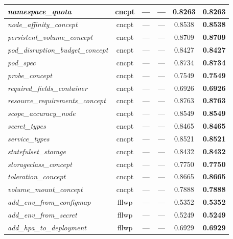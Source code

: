 \begin{footnotesize}
\begin{longtable}{|p{3.6cm}|c|c|c|c|c|}
\hline
\textit{namespace\_\allowbreak{}quota} & cncpt & --- & --- & 0.8263 & \textbf{0.8263} \\
\hline
\textit{node\_\allowbreak{}affinity\_\allowbreak{}concept} & cncpt & --- & --- & 0.8538 & \textbf{0.8538} \\
\hline
\textit{persistent\_\allowbreak{}volume\_\allowbreak{}concept} & cncpt & --- & --- & 0.8709 & \textbf{0.8709} \\
\hline
\textit{pod\_\allowbreak{}disruption\_\allowbreak{}budget\_\allowbreak{}concept} & cncpt & --- & --- & 0.8427 & \textbf{0.8427} \\
\hline
\textit{pod\_\allowbreak{}spec} & cncpt & --- & --- & 0.8734 & \textbf{0.8734} \\
\hline
\textit{probe\_\allowbreak{}concept} & cncpt & --- & --- & 0.7549 & \textbf{0.7549} \\
\hline
\textit{required\_\allowbreak{}fields\_\allowbreak{}container} & cncpt & --- & --- & 0.6926 & \textbf{0.6926} \\
\hline
\textit{resource\_\allowbreak{}requirements\_\allowbreak{}concept} & cncpt & --- & --- & 0.8763 & \textbf{0.8763} \\
\hline
\textit{scope\_\allowbreak{}accuracy\_\allowbreak{}node} & cncpt & --- & --- & 0.8549 & \textbf{0.8549} \\
\hline
\textit{secret\_\allowbreak{}types} & cncpt & --- & --- & 0.8465 & \textbf{0.8465} \\
\hline
\textit{service\_\allowbreak{}types} & cncpt & --- & --- & 0.8521 & \textbf{0.8521} \\
\hline
\textit{statefulset\_\allowbreak{}storage} & cncpt & --- & --- & 0.8432 & \textbf{0.8432} \\
\hline
\textit{storageclass\_\allowbreak{}concept} & cncpt & --- & --- & 0.7750 & \textbf{0.7750} \\
\hline
\textit{toleration\_\allowbreak{}concept} & cncpt & --- & --- & 0.8665 & \textbf{0.8665} \\
\hline
\textit{volume\_\allowbreak{}mount\_\allowbreak{}concept} & cncpt & --- & --- & 0.7888 & \textbf{0.7888} \\
\hline
\textit{add\_\allowbreak{}env\_\allowbreak{}from\_\allowbreak{}configmap} & fllwp & --- & --- & 0.5352 & \textbf{0.5352} \\
\hline
\textit{add\_\allowbreak{}env\_\allowbreak{}from\_\allowbreak{}secret} & fllwp & --- & --- & 0.5249 & \textbf{0.5249} \\
\hline
\textit{add\_\allowbreak{}hpa\_\allowbreak{}to\_\allowbreak{}deployment} & fllwp & --- & --- & 0.6929 & \textbf{0.6929} \\

\end{longtable}
\end{footnotesize}
